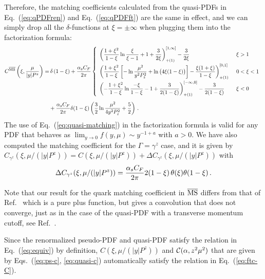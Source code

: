 \documentclass[prd,aps,twocolumn,preprintnumbers,showpacs,nofootinbib,superscriptaddress,notitlepage]{revtex4-1}
\newcommand{\nn}{\nonumber}
\DeclareRobustCommand{\eq}[1]{Eq.~(\ref{eq:#1})}
\begin{document}
\begin{widetext}
Therefore, the matching coefficients calculated from the quasi-PDFs in Eq.~(\ref{eq:qPDFren}) and Eq.~(\ref{eq:qPDFft}) are the same in effect, and we can simply drop all the $\delta$-functions at $\xi=\pm\infty$ when plugging them into the factorization formula:
\begin{align} \label{eq:quasi-matching}
C^{\overline{\rm MS}}\left(\xi, {\mu\over |y| P^z}\right)
= &\, \delta\left(1-\xi\right)+{\alpha_sC_F\over 2\pi}\left\{
\begin{array}{ll}
\displaystyle \left({1+\xi^2\over 1-\xi}\ln {\xi\over \xi-1} + 1 + {3\over 2\xi}\right)^{[1,\infty]}_{+(1)}- {3\over 2\xi}
&\, \xi>1
\nn\\[10pt]
\displaystyle \left({1+\xi^2\over 1-\xi}\left[
- \ln{\mu^2\over y^2P_z^2} + \ln\big(4\xi(1-\xi)\big)\right] - {\xi(1+\xi)\over 1-\xi}\right)^{[0,1]}_{+(1)}
&\, 0<\xi<1
\nn\\[10pt]
\displaystyle  \left(-{1+\xi^2\over 1-\xi}\ln {-\xi\over 1-\xi} - 1 + {3\over 2(1-\xi)}\right)^{[-\infty,0]}_{+(1)} - {3\over 2(1-\xi)}\quad
&\, \xi<0
\end{array}\right.\nn\\[5pt]
& + {\alpha_sC_F\over 2\pi}\delta(1-\xi) \left( {3\over2}\ln{\mu^2\over 4y^2P_z^2} + {5\over2}\right)\,.
\end{align}
The use of \eq{quasi-matching} in the factorization formula is valid for any PDF that behaves as $\lim_{y\to 0} f(y,\mu) \sim y^{-1+a}$ with $a>0$.
We have also computed the matching coefficient for the $\Gamma=\gamma^z$ case, and it is given by $C_{\gamma^z}(\xi, \mu/(|y| P^z)) = C(\xi, \mu/(|y| P^z)) + \Delta C_{\gamma^z}(\xi, \mu/(|y| P^z))$ with
\begin{align}
\Delta C_{\gamma^z}(\xi, \mu/(|y| P^z))  = {\alpha_s C_F\over 2\pi} 2(1-\xi)  
  \,\theta(\xi)\theta(1-\xi) \,.
\end{align}

Note that our result for the quark matching coefficient in $\overline{\rm MS}$ differs from that of Ref.~\cite{Wang:2017qyg} which is a pure plus function, but gives a convolution that does not converge, just as in the case of the quasi-PDF with a transverse momentum cutoff, see Ref.~\cite{Stewart:2017tvs}.

Since the renormalized pseudo-PDF and quasi-PDF satisfy the relation in Eq.~(\ref{eq:equiv}) by definition, $C\left(\xi, \mu/(|y| P^z)\right)$ and ${\cal C}(\alpha,z^2\mu^2)$ that are given by Eqs.~(\ref{eq:ps-c}, \ref{eq:quasi-c}) automatically satisfy the relation in Eq.~(\ref{eq:ftc-C}). 


\end{widetext}
\end{document}
